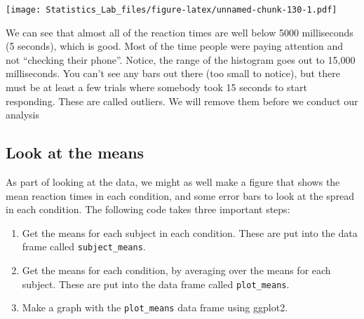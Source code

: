 \documentclass[
]{book}
\providecommand{\tightlist}{%
  \setlength{\itemsep}{0pt}\setlength{\parskip}{0pt}}
\begin{document}
\texttt{[image: Statistics\_Lab\_files/figure-latex/unnamed-chunk-130-1.pdf]}

We can see that almost all of the reaction times are well below 5000 milliseconds (5 seconds), which is good. Most of the time people were paying attention and not ``checking their phone''. Notice, the range of the histogram goes out to 15,000 milliseconds. You can't see any bars out there (too small to notice), but there must be at least a few trials where somebody took 15 seconds to start responding. These are called outliers. We will remove them before we conduct our analysis

\hypertarget{look-at-the-means}{%
\subsection{Look at the means}\label{look-at-the-means}}

As part of looking at the data, we might as well make a figure that shows the mean reaction times in each condition, and some error bars to look at the spread in each condition. The following code takes three important steps:

\begin{enumerate}
\def\labelenumi{\arabic{enumi}.}
\tightlist
\item
  Get the means for each subject in each condition. These are put into the data frame called \texttt{subject\_means}.
\item
  Get the means for each condition, by averaging over the means for each subject. These are put into the data frame called \texttt{plot\_means}.
\item
  Make a graph with the \texttt{plot\_means} data frame using ggplot2.
\end{enumerate}
\end{document}
